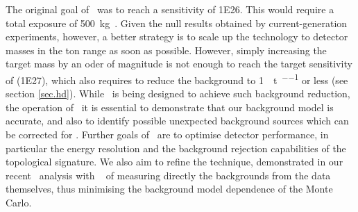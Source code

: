 The original goal of \Next\ was to reach a sensitivity of \SI{1E26}{\yr}. This would require a total exposure of \SI{500}{\kg\yr}. Given the null results obtained 
by current-generation experiments, however, a better strategy is to scale up the technology to detector masses in the ton range as soon as possible. However, simply increasing the target mass by an oder of magnitude is not enough to reach the target sensitivity of \NHD (\SI{1E27}{\yr}), which also requires to reduce the background to \SI{1}{\ev\per\tonne\per\yr} or less (see section \ref{sec.hd}). While \NHD\ is being designed to achieve such background reduction, the operation of \Next\ it is essential to demonstrate that our background model is accurate, and also to identify possible unexpected background sources which can be corrected for \NHD. Further goals of \Next\ are to optimise detector performance, in particular the energy resolution and the background rejection capabilities of the topological signature. We also aim to refine the technique, demonstrated in our recent \bbtnu\ analysis with \NEW\ \cite{nextcollaboration2021measurement} of measuring directly the backgrounds from the data themselves, thus minimising the background model dependence of the Monte Carlo.  




